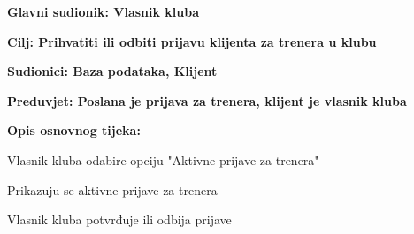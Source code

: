 						\noindent {}
						\begin{packed_item}
							
							\item \textbf{Glavni sudionik: Vlasnik kluba}
							\item  \textbf{Cilj: Prihvatiti ili odbiti prijavu klijenta za trenera u klubu} 
							\item  \textbf{Sudionici: Baza podataka, Klijent}
							\item  \textbf{Preduvjet: Poslana je prijava za trenera, klijent je vlasnik kluba}
							\item  \textbf{Opis osnovnog tijeka: }
							
							\item[] \begin{packed_enum}
								
								\item Vlasnik kluba odabire opciju "Aktivne prijave za trenera"
								\item Prikazuju se aktivne prijave za trenera
								\item Vlasnik kluba potvrđuje ili odbija prijave

							\end{packed_enum}
							\bigskip
								\bigskip
							
						\end{packed_item}
					
